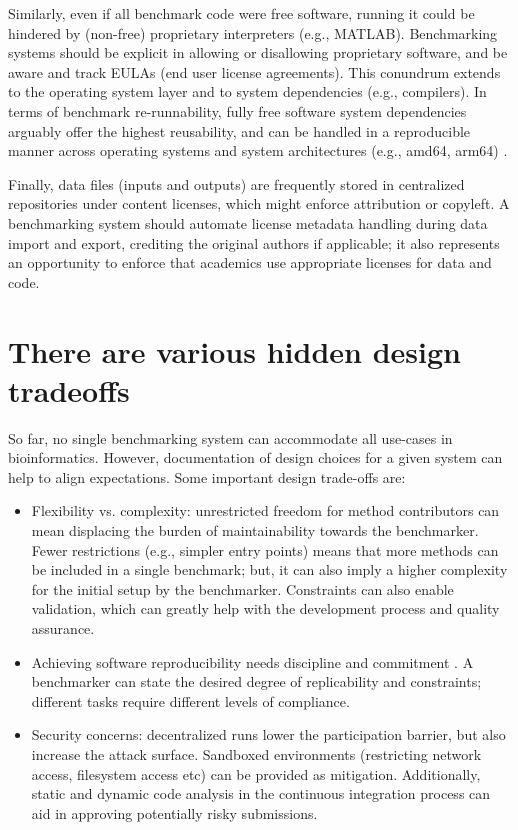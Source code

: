\documentclass[11pt]{article}
\begin{document}

Similarly, even if all benchmark code were free software, running it could be hindered by (non-free) proprietary interpreters (e.g., MATLAB). Benchmarking systems should be explicit in allowing or disallowing proprietary software, and be aware and track EULAs (end user license agreements). This conundrum extends to the operating system layer and to system dependencies (e.g., compilers). In terms of benchmark re-runnability, fully free software system dependencies arguably offer the highest reusability, and can be handled in a reproducible manner across operating systems and system architectures (e.g., amd64, arm64) \cite{Droge2023-ax}.

Finally, data files (inputs and outputs) are frequently stored in centralized repositories \cite{Potter2015-fs, Sicilia2017-ko, van-de-Sandt2019-wd} under content licenses, which might enforce attribution or copyleft. A benchmarking system should automate license metadata handling during data import and export, crediting the original authors if applicable; it also represents an opportunity to enforce that academics use appropriate licenses for data and code. 


\section*{There are various hidden design tradeoffs}

So far, no single benchmarking system can accommodate all use-cases in bioinformatics. However, documentation of design choices for a given system can help to align expectations. Some important design trade-offs are:

\begin{itemize}
    \item Flexibility vs. complexity: unrestricted freedom for method contributors can mean displacing the burden of maintainability towards the benchmarker. Fewer restrictions (e.g., simpler entry points) means that more methods can be included in a single benchmark; but, it can also imply a higher complexity for the initial setup by the benchmarker. Constraints can also enable validation, which can greatly help with the development process and quality assurance.
    \item  Achieving software reproducibility needs discipline and commitment \cite{Lamb2021-tb}. A benchmarker can state the desired degree of replicability and constraints; different tasks require different levels of compliance. 
    \item  Security concerns: decentralized runs lower the participation barrier, but also increase the attack  surface. Sandboxed environments (restricting network access, filesystem access etc) can be provided as mitigation. Additionally, static and dynamic code analysis in the continuous integration process can aid in approving potentially risky submissions.
\end{itemize}
\end{document}

